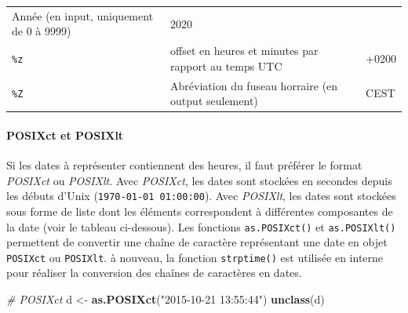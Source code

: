 \documentclass[
  11pt,
]{book}
\newenvironment{Shaded}{\begin{snugshade}}{\end{snugshade}}
\newcommand{\CommentTok}[1]{\textcolor[rgb]{0.56,0.35,0.01}{\textit{#1}}}
\newcommand{\KeywordTok}[1]{\textcolor[rgb]{0.13,0.29,0.53}{\textbf{#1}}}
\newcommand{\NormalTok}[1]{#1}
\newcommand{\StringTok}[1]{\textcolor[rgb]{0.31,0.60,0.02}{#1}}
\numberwithin{equation}{section}
\numberwithin{countremarque}{section}
\begin{document}
\begin{longtable}[]{@{}lll@{}}
\begin{minipage}[t]{0.42\columnwidth}
Année (en input, uniquement de 0 à 9999)\strut
\end{minipage} & \begin{minipage}[t]{0.29\columnwidth}\raggedright
2020\strut
\end{minipage}\tabularnewline
\begin{minipage}[t]{0.20\columnwidth}\raggedright
\texttt{\%z}\strut
\end{minipage} & \begin{minipage}[t]{0.42\columnwidth}\raggedright
offset en heures et minutes par rapport au temps UTC\strut
\end{minipage} & \begin{minipage}[t]{0.29\columnwidth}\raggedright
+0200\strut
\end{minipage}\tabularnewline
\begin{minipage}[t]{0.20\columnwidth}\raggedright
\texttt{\%Z}\strut
\end{minipage} & \begin{minipage}[t]{0.42\columnwidth}\raggedright
Abréviation du fuseau horraire (en output seulement)\strut
\end{minipage} & \begin{minipage}[t]{0.29\columnwidth}\raggedright
CEST\strut
\end{minipage}\tabularnewline
\bottomrule
\end{longtable}

\hypertarget{dates-POSIXct}{%
\paragraph{POSIXct et POSIXlt}\label{dates-POSIXct}}

Si les dates à représenter contiennent des heures, il faut préférer le format \emph{POSIXct} ou \emph{POSIXlt}. Avec \emph{POSIXct}, les dates sont stockées en secondes depuis les débuts d'Unix (\texttt{1970-01-01\ 01:00:00}). Avec \emph{POSIXlt}, les dates sont stockées sous forme de liste dont les éléments correspondent à différentes composantes de la date (voir le tableau ci-dessous). Les fonctions \texttt{as.POSIXct()} et \texttt{as.POSIXlt()} permettent de convertir une chaîne de caractère représentant une date en objet \texttt{POSIXct} ou \texttt{POSIXlt}. à nouveau, la fonction \texttt{strptime()} est utilisée en interne pour réaliser la conversion des chaînes de caractères en dates.

\begin{Shaded}
\begin{Highlighting}[]
\CommentTok{\# POSIXct}
\NormalTok{d \textless{}{-}}\StringTok{ }\KeywordTok{as.POSIXct}\NormalTok{(}\StringTok{"2015{-}10{-}21 13:55:44"}\NormalTok{)}
\KeywordTok{unclass}\NormalTok{(d)}
\end{Highlighting}
\end{Shaded}
\end{document}
